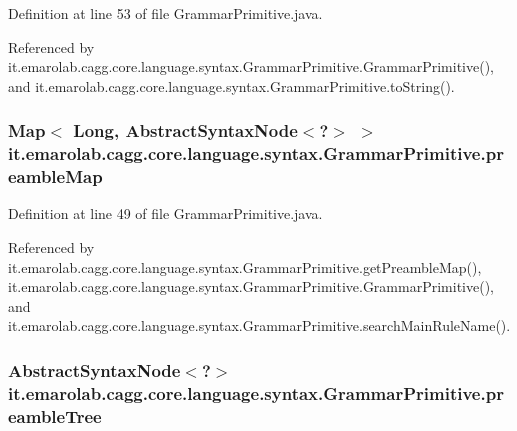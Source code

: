 Definition at line 53 of file Grammar\-Primitive.\-java.



Referenced by it.\-emarolab.\-cagg.\-core.\-language.\-syntax.\-Grammar\-Primitive.\-Grammar\-Primitive(), and it.\-emarolab.\-cagg.\-core.\-language.\-syntax.\-Grammar\-Primitive.\-to\-String().

\hypertarget{classit_1_1emarolab_1_1cagg_1_1core_1_1language_1_1syntax_1_1GrammarPrimitive_a16aa03b3d1b8f106c3c5a38272956bb3}{
\subsubsection[{preamble\-Map}]{\setlength{\rightskip}{0pt plus 5cm}Map$<$ Long, Abstract\-Syntax\-Node$<$?$>$ $>$ it.\-emarolab.\-cagg.\-core.\-language.\-syntax.\-Grammar\-Primitive.\-preamble\-Map\hspace{0.3cm}{\ttfamily [private]}}}\label{classit_1_1emarolab_1_1cagg_1_1core_1_1language_1_1syntax_1_1GrammarPrimitive_a16aa03b3d1b8f106c3c5a38272956bb3}


Definition at line 49 of file Grammar\-Primitive.\-java.



Referenced by it.\-emarolab.\-cagg.\-core.\-language.\-syntax.\-Grammar\-Primitive.\-get\-Preamble\-Map(), it.\-emarolab.\-cagg.\-core.\-language.\-syntax.\-Grammar\-Primitive.\-Grammar\-Primitive(), and it.\-emarolab.\-cagg.\-core.\-language.\-syntax.\-Grammar\-Primitive.\-search\-Main\-Rule\-Name().

\hypertarget{classit_1_1emarolab_1_1cagg_1_1core_1_1language_1_1syntax_1_1GrammarPrimitive_a5dd8a9ff244cc578bdc548f23514bbb6}{
\subsubsection[{preamble\-Tree}]{\setlength{\rightskip}{0pt plus 5cm}Abstract\-Syntax\-Node$<$?$>$ it.\-emarolab.\-cagg.\-core.\-language.\-syntax.\-Grammar\-Primitive.\-preamble\-Tree\hspace{0.3cm}{\ttfamily [private]}}}\label{classit_1_1emarolab_1_1cagg_1_1core_1_1language_1_1syntax_1_1GrammarPrimitive_a5dd8a9ff244cc578bdc548f23514bbb6}


